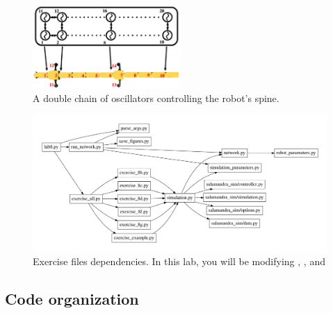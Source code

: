 \documentclass{cmc}
\begin{document}
\begin{figure}[h]
  \centering
  \includegraphics[width=0.5\textwidth]{figures/model_controller.png}
  \caption[Controller model]{A double chain of oscillators controlling
    the robot’s spine.}
  \label{fig:controller-model}
\end{figure}

\begin{figure}[ht]
  \centering \includegraphics[width=1.0\textwidth]{figures/files}
  \caption{\label{fig:files} Exercise files dependencies. In this lab, you will
    be modifying , ,
     and }
\end{figure}


\subsection*{Code organization}
\label{subsec:code}
\end{document}
